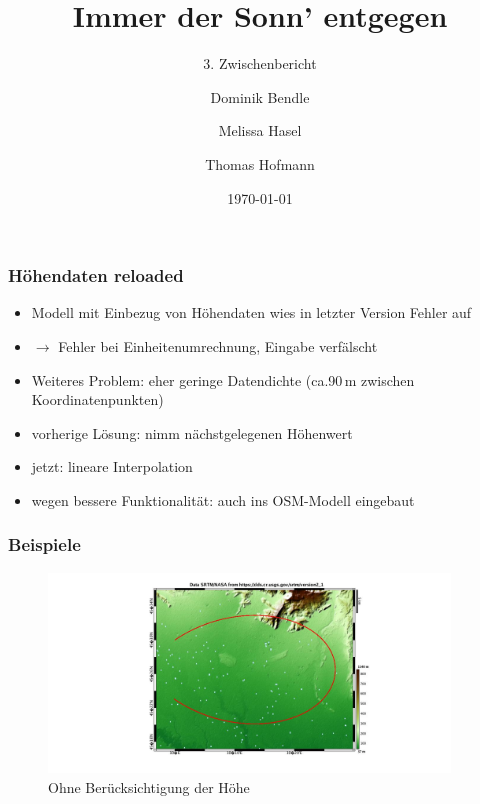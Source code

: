 \documentclass[aspectratio=43]{beamer}
\title{Immer der Sonn' entgegen}
\subtitle{3. Zwischenbericht}
\author{Dominik Bendle \and Melissa Hasel \and Thomas Hofmann}
\date{\today}
\institute{TU Kaiserslautern}
\begin{document}
\begin{frame}[plain]


\end{frame}

\begin{frame}
    \frametitle{Höhendaten reloaded}
    \begin{itemize}
        \item Modell mit Einbezug von Höhendaten wies in letzter Version Fehler auf
        \item[] $\rightarrow$ Fehler bei Einheitenumrechnung, Eingabe verfälscht
        \item Weiteres Problem: eher geringe Datendichte (ca.90\,m zwischen
            Koordinatenpunkten)
        \item vorherige Lösung: nimm nächstgelegenen Höhenwert
        \item jetzt: lineare Interpolation
        \item wegen bessere Funktionalität: auch ins OSM-Modell eingebaut
    \end{itemize}
\end{frame}

\begin{frame}
    \frametitle{Beispiele}
    \begin{figure}[t]
        \centering
        \includegraphics[width=0.95\textwidth]{bilder/nostreetnoele.jpg}
        \caption{Ohne Berücksichtigung der Höhe}
    \end{figure}
\end{frame}
\end{document}
